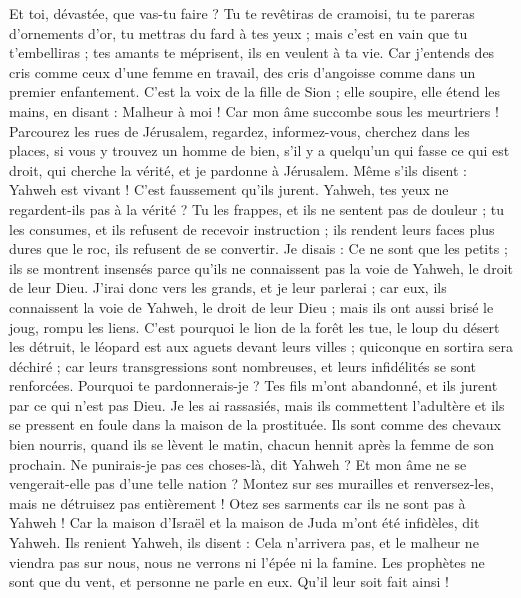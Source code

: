 \begin{multicols}{2}
Et toi, dévastée, que vas-tu faire ? Tu te revêtiras de cramoisi, tu te pareras d'ornements d'or, tu mettras du fard à tes yeux ; mais c'est en vain que tu t'embelliras ; tes amants te méprisent, ils en veulent à ta vie.
Car j'entends des cris comme ceux d'une femme en travail, des cris d'angoisse comme dans un premier enfantement. C'est la voix de la fille de Sion ; elle soupire, elle étend les mains, en disant : Malheur à moi ! Car mon âme succombe sous les meurtriers !
\VerseOne{}Parcourez les rues de Jérusalem, regardez, informez-vous, cherchez dans les places, si vous y trouvez un homme de bien, s'il y a quelqu'un qui fasse ce qui est droit, qui cherche la vérité, et je pardonne à Jérusalem.
Même s'ils disent : Yahweh est vivant ! C'est faussement qu'ils jurent.
Yahweh, tes yeux ne regardent-ils pas à la vérité ? Tu les frappes, et ils ne sentent pas de douleur ; tu les consumes, et ils refusent de recevoir instruction ; ils rendent leurs faces plus dures que le roc, ils refusent de se convertir.
Je disais : Ce ne sont que les petits ; ils se montrent insensés parce qu'ils ne connaissent pas la voie de Yahweh, le droit de leur Dieu.
J'irai donc vers les grands, et je leur parlerai ; car eux, ils connaissent la voie de Yahweh, le droit de leur Dieu ; mais ils ont aussi brisé le joug, rompu les liens.
C'est pourquoi le lion de la forêt les tue, le loup du désert les détruit, le léopard est aux aguets devant leurs villes ; quiconque en sortira sera déchiré ; car leurs transgressions sont nombreuses, et leurs infidélités se sont renforcées.
Pourquoi te pardonnerais-je ? Tes fils m'ont abandonné, et ils jurent par ce qui n'est pas Dieu. Je les ai rassasiés, mais ils commettent l'adultère et ils se pressent en foule dans la maison de la prostituée.
Ils sont comme des chevaux bien nourris, quand ils se lèvent le matin, chacun hennit après la femme de son prochain.
Ne punirais-je pas ces choses-là, dit Yahweh ? Et mon âme ne se vengerait-elle pas d'une telle nation ?
Montez sur ses murailles et renversez-les, mais ne détruisez pas entièrement ! Otez ses sarments car ils ne sont pas à Yahweh !
Car la maison d'Israël et la maison de Juda m'ont été infidèles, dit Yahweh.
Ils renient Yahweh, ils disent : Cela n'arrivera pas, et le malheur ne viendra pas sur nous, nous ne verrons ni l'épée ni la famine.
Les prophètes ne sont que du vent, et personne ne parle en eux. Qu'il leur soit fait ainsi !

\end{multicols}
